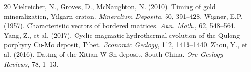 \documentclass[12pt,a4paper]{article}
\begin{document}
\begin{thebibliography}{20}
 Vielreicher, N., Groves, D., McNaughton, N. (2010). Timing of gold mineralization, Yilgarn craton. \textit{Mineralium Deposita}, 50, 391--428.
 Wigner, E.P. (1957). Characteristic vectors of bordered matrices. \textit{Ann. Math.}, 62, 548--564.
 Yang, Z., et al. (2017). Cyclic magmatic-hydrothermal evolution of the Qulong porphyry Cu-Mo deposit, Tibet. \textit{Economic Geology}, 112, 1419--1440.
 Zhou, Y., et al. (2016). Dating of the Xitian W-Sn deposit, South China. \textit{Ore Geology Reviews}, 78, 1--13.
\end{thebibliography}
\end{document}
